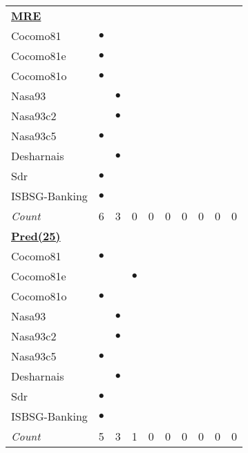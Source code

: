 \begin{figure*}[!t]
\begin{tabular}{lccccccccc}
\multicolumn{10}{l}{  \underline{{\bf MRE}}}	\\
Cocomo81	&	$\bullet$	&		&		&		&		&		&		&		&		\\
Cocomo81e	&	$\bullet$	&		&		&		&		&		&		&		&		\\
Cocomo81o	&	$\bullet$	&		&		&		&		&		&		&		&		\\
Nasa93	&		&	$\bullet$	&		&		&		&		&		&		&		\\
Nasa93c2	&		&	$\bullet$	&		&		&		&		&		&		&		\\
Nasa93c5	&	$\bullet$	&		&		&		&		&		&		&		&		\\
Desharnais	&		&	$\bullet$	&		&		&		&		&		&		&		\\
Sdr	&	$\bullet$	&		&		&		&		&		&		&		&		\\
ISBSG-Banking	&	$\bullet$	&		&		&		&		&		&		&		&		\\
\rowcolor{DarkGray}\em Count	&	6	&	3	&	0	&	0	&	0	&	0	&	0	&	0	&	0	\\

%
\hline\multicolumn{10}{l}{  \underline{{\bf Pred(25)}}}	\\
Cocomo81	&	$\bullet$	&		&		&		&		&		&		&		&		\\
Cocomo81e	&		&		&	$\bullet$	&		&		&		&		&		&		\\
Cocomo81o	&	$\bullet$	&		&		&		&		&		&		&		&		\\
Nasa93	&		&	$\bullet$	&		&		&		&		&		&		&		\\
Nasa93c2	&		&	$\bullet$	&		&		&		&		&		&		&		\\
Nasa93c5	&	$\bullet$	&		&		&		&		&		&		&		&		\\
Desharnais	&		&	$\bullet$	&		&		&		&		&		&		&		\\
Sdr	&	$\bullet$	&		&		&		&		&		&		&		&		\\
ISBSG-Banking	&	$\bullet$	&		&		&		&		&		&		&		&		\\
\rowcolor{DarkGray}\em Count	&	5	&	3	&	1	&	0	&	0	&	0	&	0	&	0	&	0	\\


\end{tabular}
\end{figure*}
